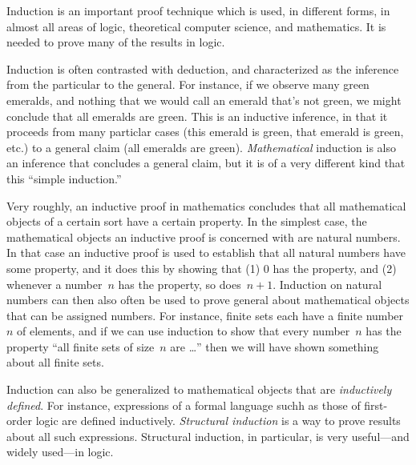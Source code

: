 \documentclass[../../../include/open-logic-section]{subfiles}
\begin{document}


Induction is an important proof technique which is used, in different
forms, in almost all areas of logic, theoretical computer science, and
mathematics.  It is needed to prove many of the results in logic.

Induction is often contrasted with deduction, and characterized as the
inference from the particular to the general.  For instance, if we
observe many green emeralds, and nothing that we would call an emerald
that's not green, we might conclude that all emeralds are green. This
is an inductive inference, in that it proceeds from many particlar
cases (this emerald is green, that emerald is green, etc.) to a
general claim (all emeralds are green).  \emph{Mathematical} induction
is also an inference that concludes a general claim, but it is of a
very different kind that this ``simple induction.''

Very roughly, an inductive proof in mathematics concludes that all
mathematical objects of a certain sort have a certain property.  In
the simplest case, the mathematical objects an inductive proof is
concerned with are natural numbers.  In that case an inductive proof
is used to establish that all natural numbers have some property, and
it does this by showing that (1) $0$ has the property, and (2)
whenever a number~$n$ has the property, so does~$n+1$.  Induction on
natural numbers can then also often be used to prove general about
mathematical objects that can be assigned numbers. For instance,
finite sets each have a finite number~$n$ of elements, and if we can
use induction to show that every number~$n$ has the property ``all
finite sets of size~$n$ are \dots'' then we will have shown something
about all finite sets.

Induction can also be generalized to mathematical objects that are
\emph{inductively defined}.  For instance, expressions of a formal
language suchh as those of first-order logic are defined inductively.
\emph{Structural induction} is a way to prove results about all such
expressions.  Structural induction, in particular, is very
useful---and widely used---in logic.
\end{document}
